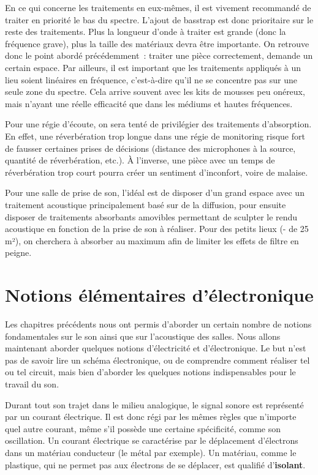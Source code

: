 \documentclass[
]{book}
\begin{document}
En ce qui concerne les traitements en eux-mêmes, il est vivement recommandé de traiter en priorité le bas du spectre. L'ajout de basstrap est donc prioritaire sur le reste des traitements. Plus la longueur d'onde à traiter est grande (donc la fréquence grave), plus la taille des matériaux devra être importante. On retrouve donc le point abordé précédemment~: traiter une pièce correctement, demande un certain espace. Par ailleurs, il est important que les traitements appliqués à un lieu soient linéaires en fréquence, c'est-à-dire qu'il ne se concentre pas sur une seule zone du spectre. Cela arrive souvent avec les kits de mousses peu onéreux, mais n'ayant une réelle efficacité que dans les médiums et hautes fréquences.

Pour une régie d'écoute, on sera tenté de privilégier des traitements d'absorption. En effet, une réverbération trop longue dans une régie de monitoring risque fort de fausser certaines prises de décisions (distance des microphones à la source, quantité de réverbération, etc.). À l'inverse, une pièce avec un temps de réverbération trop court pourra créer un sentiment d'inconfort, voire de malaise.

Pour une salle de prise de son, l'idéal est de disposer d'un grand espace avec un traitement acoustique principalement basé sur de la diffusion, pour ensuite disposer de traitements absorbants amovibles permettant de sculpter le rendu acoustique en fonction de la prise de son à réaliser. Pour des petits lieux (- de 25 m²), on cherchera à absorber au maximum afin de limiter les effets de filtre en peigne.

\hypertarget{notions-uxe9luxe9mentaires-duxe9lectronique}{%
\chapter{Notions élémentaires d'électronique}\label{notions-uxe9luxe9mentaires-duxe9lectronique}}

Les chapitres précédents nous ont permis d'aborder un certain nombre de notions fondamentales sur le son ainsi que sur l'acoustique des salles. Nous allons maintenant aborder quelques notions d'électricité et d'électronique. Le but n'est pas de savoir lire un schéma électronique, ou de comprendre comment réaliser tel ou tel circuit, mais bien d'aborder les quelques notions indispensables pour le travail du son.

Durant tout son trajet dans le milieu analogique, le signal sonore est représenté par un courant électrique. Il est donc régi par les mêmes règles que n'importe quel autre courant, même s'il possède une certaine spécificité, comme son oscillation. Un courant électrique se caractérise par le déplacement d'électrons dans un matériau conducteur (le métal par exemple). Un matériau, comme le plastique, qui ne permet pas aux électrons de se déplacer, est qualifié d'\textbf{isolant}.
\end{document}

